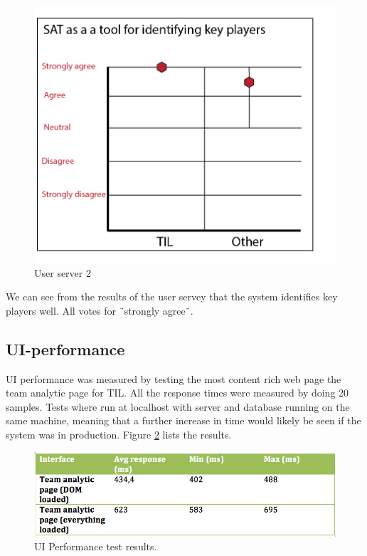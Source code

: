 \begin{figure}[ht!]
\centering
\includegraphics[width=1\textwidth]{images/evaluation/user_servery2}
\caption{User server 2}
\label{fig:user_servery2}
\end{figure}

We can see from the results of the user servey that the system identifies key players well. All votes for ¨strongly agree¨.

\subsection{UI-performance}
UI performance was measured by testing the most content rich web page the team analytic page for \ac{TIL}. All the response times were measured by doing 20 samples. Tests where run at localhost with server and database running on the same machine, meaning that a further increase in time would likely be seen if the system was in production. Figure \ref{fig:uiperform} lists the results.

\begin{figure}[ht!]
\centering
\includegraphics[width=1\textwidth]{images/evaluation/uipeform}
\caption{UI Performance test results. }
\label{fig:uiperform}
\end{figure}


